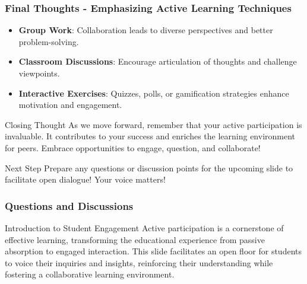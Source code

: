\documentclass[aspectratio=169]{beamer}
\begin{document}
\begin{frame}[fragile]
    \frametitle{Final Thoughts - Emphasizing Active Learning Techniques}
    \begin{itemize}
        \item \textbf{Group Work}: Collaboration leads to diverse perspectives and better problem-solving.
        \item \textbf{Classroom Discussions}: Encourage articulation of thoughts and challenge viewpoints.
        \item \textbf{Interactive Exercises}: Quizzes, polls, or gamification strategies enhance motivation and engagement.
    \end{itemize}

    \begin{block}{Closing Thought}
        As we move forward, remember that your active participation is invaluable. It contributes to your success and enriches the learning environment for peers. Embrace opportunities to engage, question, and collaborate!
    \end{block}

    \begin{alertblock}{Next Step}
        Prepare any questions or discussion points for the upcoming slide to facilitate open dialogue! Your voice matters!
    \end{alertblock}
\end{frame}

\begin{frame}[fragile]
  \frametitle{Questions and Discussions}
  \begin{block}{Introduction to Student Engagement}
    Active participation is a cornerstone of effective learning, transforming the educational experience from passive absorption to engaged interaction. This slide facilitates an open floor for students to voice their inquiries and insights, reinforcing their understanding while fostering a collaborative learning environment.
  \end{block}
\end{frame}
\end{document}
